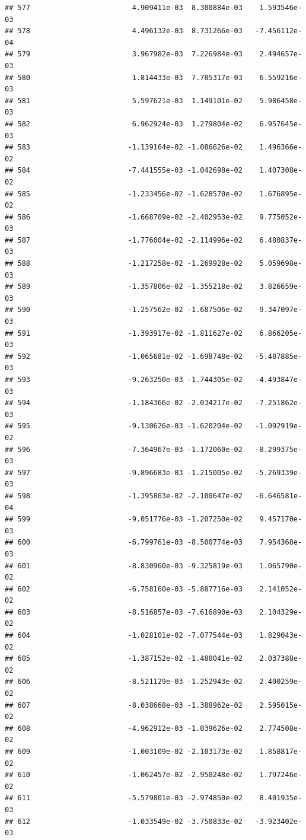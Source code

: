 \documentclass[
]{article}
\begin{document}
\begin{verbatim}
## 577                        4.909411e-03  8.300884e-03    1.593546e-03
## 578                        4.496132e-03  8.731266e-03   -7.456112e-04
## 579                        3.967982e-03  7.226984e-03    2.494657e-03
## 580                        1.814433e-03  7.785317e-03    6.559216e-03
## 581                        5.597621e-03  1.149101e-02    5.986458e-03
## 582                        6.962924e-03  1.279804e-02    6.957645e-03
## 583                       -1.139164e-02 -1.086626e-02    1.496366e-02
## 584                       -7.441555e-03 -1.042698e-02    1.407308e-02
## 585                       -1.233456e-02 -1.628570e-02    1.676895e-02
## 586                       -1.668709e-02 -2.402953e-02    9.775052e-03
## 587                       -1.776004e-02 -2.114996e-02    6.480837e-03
## 588                       -1.217258e-02 -1.269928e-02    5.059698e-03
## 589                       -1.357806e-02 -1.355218e-02    3.826659e-03
## 590                       -1.257562e-02 -1.687506e-02    9.347097e-03
## 591                       -1.393917e-02 -1.811627e-02    6.866205e-03
## 592                       -1.065681e-02 -1.698748e-02   -5.487885e-03
## 593                       -9.263250e-03 -1.744305e-02   -4.493847e-03
## 594                       -1.184366e-02 -2.034217e-02   -7.251862e-03
## 595                       -9.130626e-03 -1.620204e-02   -1.092919e-02
## 596                       -7.364967e-03 -1.172060e-02   -8.299375e-03
## 597                       -9.896683e-03 -1.215005e-02   -5.269339e-03
## 598                       -1.395863e-02 -2.100647e-02   -6.646581e-04
## 599                       -9.051776e-03 -1.207250e-02    9.457170e-03
## 600                       -6.799761e-03 -8.500774e-03    7.954368e-03
## 601                       -8.830960e-03 -9.325819e-03    1.065790e-02
## 602                       -6.758160e-03 -5.887716e-03    2.141052e-02
## 603                       -8.516857e-03 -7.616890e-03    2.104329e-02
## 604                       -1.028101e-02 -7.077544e-03    1.829043e-02
## 605                       -1.387152e-02 -1.480041e-02    2.037388e-02
## 606                       -8.521129e-03 -1.252943e-02    2.400259e-02
## 607                       -8.038668e-03 -1.388962e-02    2.595015e-02
## 608                       -4.962912e-03 -1.039626e-02    2.774508e-02
## 609                       -1.003109e-02 -2.103173e-02    1.858817e-02
## 610                       -1.062457e-02 -2.950248e-02    1.797246e-02
## 611                       -5.579801e-03 -2.974850e-02    8.401935e-03
## 612                       -1.033549e-02 -3.750833e-02   -3.923402e-03

\end{verbatim}
\end{document}
